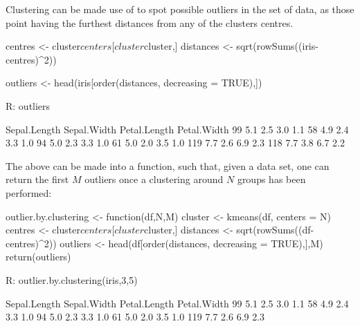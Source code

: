 Clustering can be made use of to spot 
possible outliers in the set of data, 
as those point having the furthest distances
from any of the clusters centres.
\begin{example}
centres   <- cluster$centers[cluster$cluster,]
distances <- sqrt(rowSums((iris-centres)^2))

outliers  <- head(iris[order(distances, decreasing = TRUE),])

R: outliers

    Sepal.Length Sepal.Width Petal.Length Petal.Width
99           5.1         2.5          3.0         1.1
58           4.9         2.4          3.3         1.0
94           5.0         2.3          3.3         1.0
61           5.0         2.0          3.5         1.0
119          7.7         2.6          6.9         2.3
118          7.7         3.8          6.7         2.2
\end{example}
The above can be made into a function, such that, given 
a data set, one can return the first $M$ outliers once 
a clustering around $N$ groups has been performed:
\begin{example}
outlier.by.clustering <- function(df,N,M){
    cluster   <- kmeans(df, centers = N)
    centres   <- cluster$centers[cluster$cluster,]
    distances <- sqrt(rowSums((df-centres)^2))
    outliers  <- head(df[order(distances, 
                      decreasing = TRUE),],M)
    return(outliers)
}

R: outlier.by.clustering(iris,3,5)

    Sepal.Length Sepal.Width Petal.Length Petal.Width
99           5.1         2.5          3.0         1.1
58           4.9         2.4          3.3         1.0
94           5.0         2.3          3.3         1.0
61           5.0         2.0          3.5         1.0
119          7.7         2.6          6.9         2.3
\end{example}



